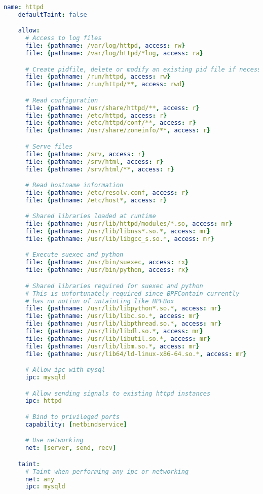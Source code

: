 \begin{lstlisting}[language=yaml, gobble=4, float=false, caption={[A \bpfcontain{} policy for Apache httpd]
  A \bpfcontain{} policy for Apache httpd.
  %\todo{Describe this}
}, label={lst:bpfcontain-apache}]
    name: httpd
    defaultTaint: false

    allow:
      # Access to log files
      file: {pathname: /var/log/httpd, access: rw}
      file: {pathname: /var/log/httpd/*log, access: ra}

      # Create pidfile, delete or modify an existing pid file if necessary
      file: {pathname: /run/httpd, access: rw}
      file: {pathname: /run/httpd/**, access: rwd}

      # Read configuration
      file: {pathname: /usr/share/httpd/**, access: r}
      file: {pathname: /etc/httpd, access: r}
      file: {pathname: /etc/httpd/conf/**, access: r}
      file: {pathname: /usr/share/zoneinfo/**, access: r}

      # Serve files
      file: {pathname: /srv, access: r}
      file: {pathname: /srv/html, access: r}
      file: {pathname: /srv/html/**, access: r}

      # Read hostname information
      file: {pathname: /etc/resolv.conf, access: r}
      file: {pathname: /etc/host*, access: r}

      # Shared libraries loaded at runtime
      file: {pathname: /usr/lib/httpd/modules/*.so, access: mr}
      file: {pathname: /usr/lib/libnss*.so.*, access: mr}
      file: {pathname: /usr/lib/libgcc_s.so.*, access: mr}

      # Execute suexec and python
      file: {pathname: /usr/bin/suexec, access: rx}
      file: {pathname: /usr/bin/python, access: rx}

      # Shared libraries required for suexec and python
      # This is unfortunately required since BPFContain currently
      # has no notion of untainting like BPFBox
      file: {pathname: /usr/lib/libpython*.so.*, access: mr}
      file: {pathname: /usr/lib/libc.so.*, access: mr}
      file: {pathname: /usr/lib/libpthread.so.*, access: mr}
      file: {pathname: /usr/lib/libdl.so.*, access: mr}
      file: {pathname: /usr/lib/libutil.so.*, access: mr}
      file: {pathname: /usr/lib/libm.so.*, access: mr}
      file: {pathname: /usr/lib64/ld-linux-x86-64.so.*, access: mr}

      # Allow ipc with mysql
      ipc: mysqld

      # Allow sending signals to existing httpd instances
      ipc: httpd

      # Bind to privileged ports
      capability: [netbindservice]

      # Use networking
      net: [server, send, recv]

    taint:
      # Taint when performing any ipc or networking
      net: any
      ipc: mysqld
\end{lstlisting}

